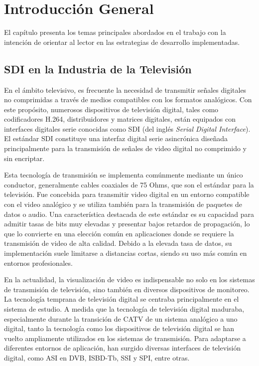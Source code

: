\chapter{Introducción General}\label{Chapter1}

El capítulo presenta los temas principales abordados en el trabajo con la
intención de orientar al lector en las estrategias de desarrollo
implementadas.

\section{SDI en la Industria de la Televisión}

En el ámbito televisivo, es frecuente la necesidad de transmitir señales
digitales no comprimidas a través de medios compatibles con los formatos
analógicos. Con este propósito, numerosos dispositivos de televisión digital,
tales como codificadores H.264, distribuidores y matrices digitales, están
equipados con interfaces digitales serie conocidas como SDI (del inglés
\textit{Serial Digital Interface}). El estándar SDI constituye una interfaz
digital serie asincrónica diseñada principalmente para la transmisión de señales
de video digital no comprimido y sin encriptar.

Esta tecnología de transmisión se implementa comúnmente mediante un único
conductor, generalmente cables coaxiales de 75 Ohms, que son el estándar para
la televisión. Fue concebida para transmitir video digital en un entorno
compatible con el video analógico y se utiliza también para la transmisión de
paquetes de datos o audio. Una característica destacada de este estándar es su
capacidad para admitir tasas de bits muy elevadas y presentar bajos retardos de
propagación, lo que lo convierte en una elección común en aplicaciones donde se
requiere la transmisión de video de alta calidad. Debido a la elevada tasa de
datos, su implementación suele limitarse a distancias cortas, siendo su uso más
común en entornos profesionales.

En la actualidad, la visualización de video es indispensable no solo en los
sistemas de transmisión de televisión, sino también en diversos dispositivos de
monitoreo. La tecnología temprana de televisión digital se centraba
principalmente en el sistema de estudio. A medida que la tecnología de
televisión digital maduraba, especialmente durante la transición de CATV de un
sistema analógico a uno digital, tanto la tecnología como los dispositivos de
televisión digital se han vuelto ampliamente utilizados en los sistemas de
transmisión. Para adaptarse a diferentes entornos de aplicación, han surgido
diversas interfaces de televisión digital, como ASI en DVB, ISBD-Tb, SSI y SPI,
entre otras.

